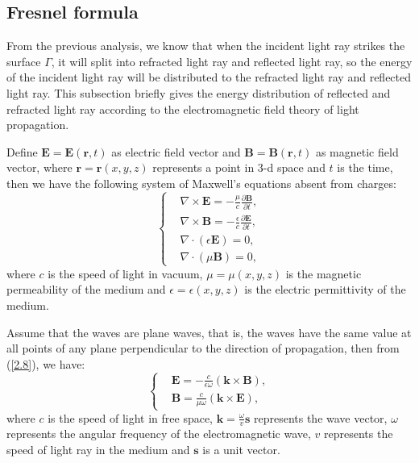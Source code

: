 \documentclass[a4paper,12pt,]{article}
\numberwithin{equation}{section}
\numberwithin{equation}{section} \allowdisplaybreaks
\begin{document}



\subsection{Fresnel formula}

From the previous analysis,  we know that when the incident light ray strikes the surface $\Gamma$, it will split into refracted light ray and reflected light ray, so the energy of the incident light ray will be distributed to the refracted light ray and reflected light ray. This subsection briefly gives the energy distribution of reflected and refracted light ray  according to the electromagnetic field theory of light propagation.

Define $\mathbf{E} = \mathbf{E}(\mathbf{r},t)$ as electric field vector and $\mathbf{B} = \mathbf{B}(\mathbf{r},t)$ as magnetic field vector, where $\mathbf{r} = \mathbf{r}(x,y,z)$ represents a point in 3-d space and $t$ is the time, then we have the following system of Maxwell's equations absent from charges:
\begin{equation}\label{2.8}
  \left\{
   \begin{split}
     & \nabla\times \mathbf{E} = -\frac{\mu}{c} \frac{\partial \mathbf{B}}{\partial t},  \\
     & \nabla\times \mathbf{B} = -\frac{\epsilon}{c} \frac{\partial \mathbf{E}}{\partial t},  \\
     & \nabla \cdot (\epsilon \mathbf{E}) = 0,  \\
     & \nabla \cdot (\mu \mathbf{B}) = 0,
   \end{split}
    \right.
\end{equation}
where $c$ is the speed of light in vacuum, $\mu = \mu(x,y,z)$ is the magnetic permeability of the medium and $\epsilon = \epsilon(x,y,z)$ is the electric permittivity of the medium.

Assume that the waves are plane waves, that is, the waves have the same value at all points of any plane perpendicular to the direction of propagation, then from (\ref{2.8}), we have:
\begin{equation}\label{2.9}
  \left\{
  \begin{split}
      & \mathbf{E} = -\frac{c}{\epsilon \omega}(\mathbf{k} \times \mathbf{B}), \\
      & \mathbf{B} = \frac{c}{\mu \omega}(\mathbf{k} \times \mathbf{E}),
  \end{split}
  \right.
\end{equation}
where $c$ is the speed of light in free space, $\mathbf{k} = \displaystyle \frac{\omega}{v} \mathbf{s}$ represents the wave vector, $\omega$ represents the angular frequency of the electromagnetic wave, $v$ represents the speed of light ray in the medium and $\mathbf{s}$ is a unit vector.
\end{document}
